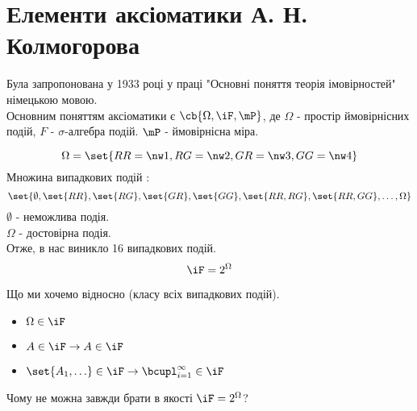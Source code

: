 \section{Елементи аксіоматики А. Н. Колмогорова}
Була запропонована у 1933 році у праці "Основні поняття теорія імовірностей" німецькою мовою. \\
Основним поняттям аксіоматики є $\cb{\Omega,\iF,\mP}$, де $\Omega$ - простір ймовірнісних подій, $F$ - $\sigma$-алгебра подій. $\mP$ - ймовірнісна міра.
\begin{exs}\label{tr:1:1}
\begin{equation*}
\Omega=\set{RR=\nw1,RG=\nw2,GR=\nw3,GG=\nw4}
\end{equation*}
Множина випадкових подій : 
\begin{equation*}
\set{\emptyset,\set{RR},\set{RG},\set{GR},\set{GG},\set{RR,RG},\set{RR,GG},\ldots,\Omega}
\end{equation*}
$\emptyset$ - неможлива подія. \\
$\Omega$ - достовірна подія. \\
Отже, в нас виникло 16 випадкових подій. \\
\begin{equation*}
\iF=2^\Omega
\end{equation*}
\end{exs}
Що ми хочемо відносно \iF (класу всіх випадкових подій).
\begin{itemize}
\item $\Omega\in\iF$
\item $A\in\iF\rightarrow A\in\iF$
\item $\set{A_1,\ldots}\in\iF\rightarrow \bcupl_{i=1}^\infty \in\iF$
\end{itemize}
Чому не можна завжди брати в якості $\iF=2^\Omega$?
